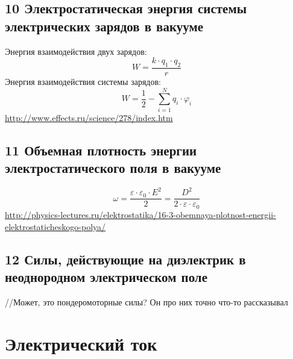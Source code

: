 \documentclass[a4paper,12pt]{article}
\begin{document}
\subsection{10   Электростатическая энергия системы электрических зарядов в вакууме}
Энергия взаимодействия двух зарядов:\\
\begin{equation}
	W = \frac{k \cdot q_1 \cdot q_2}{r}
\end{equation}
Энергия взаимодействия системы зарядов:\\
\begin{equation}
	W = \frac{1}{2} - \sum _{i = 1} ^N q_i \cdot \varphi _i
\end{equation}
\url{http://www.effects.ru/science/278/index.htm}

\subsection{11	Объемная плотность энергии электростатического поля в вакууме}
\begin{equation}
	\omega = \frac{\varepsilon \cdot \varepsilon _0 \cdot E^2}{2} = \frac{D^2}{2 \cdot \varepsilon \cdot \varepsilon _0}
\end{equation}
\url{http://physics-lectures.ru/elektrostatika/16-3-obemnaya-plotnost-energii-elektrostaticheskogo-polya/}

\subsection{12   Силы, действующие на диэлектрик в неоднородном электрическом поле}
//Может, это пондеромоторные силы? Он про них точно что-то рассказывал


\section{Электрический ток}
\end{document}
